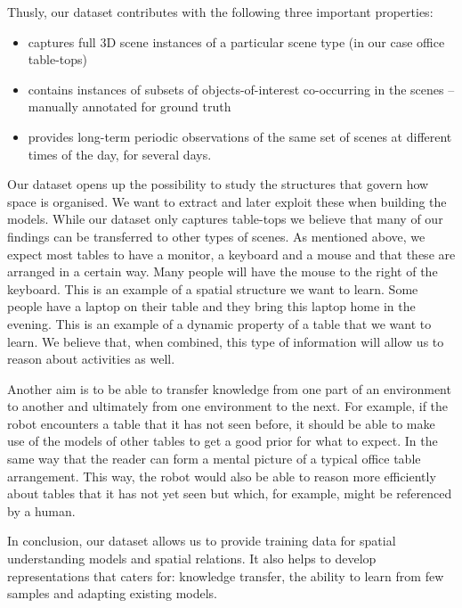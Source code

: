 \documentclass[letterpaper, 10 pt, conference]{ieeeconf}
\begin{document}
Thusly, our dataset contributes with the following three important properties:
\begin{itemize}
	\item captures full 3D scene instances of a particular scene type (in our case office table-tops)
	\item contains instances of subsets of objects-of-interest co-occurring in the scenes -- manually annotated for ground truth
	\item provides long-term periodic observations of the same set of scenes at different times of the day, for several days.
\end{itemize}

Our dataset opens up the possibility to study the structures that govern how space is organised. We want to extract and later exploit these 
when building the models. While our dataset only captures table-tops we believe that many of our findings can be transferred to other types 
of scenes. As mentioned above, we expect most tables to have a monitor, a keyboard and a mouse and that these are arranged in a certain way. 
Many people will have the mouse to the right of the keyboard. This is an example of a spatial structure we want to learn. Some people have a 
laptop on their table and they bring this laptop home in the evening. This is an example of a dynamic property of a table that we want to 
learn. We believe that, when combined, this type of information will allow us to reason about activities as well.

Another aim is to be able to transfer knowledge from one part of an
environment to another and ultimately from one environment to the
next. For example, if the robot encounters a table that it has not seen
before, it should be able to make use of the models of other tables to
get a good prior for what to expect. In the same way that the reader
can form a mental picture of a typical office table arrangement.
This way, the robot would also be able to reason more efficiently
about tables that it has not yet seen but which, for example, might be
referenced by a human.

In conclusion, our dataset allows us to provide training data 
for spatial understanding models and spatial relations. It also helps 
to develop representations that caters for: knowledge transfer, 
the ability to learn from few samples and adapting existing models.

\end{document}
